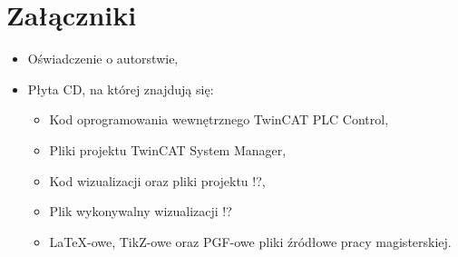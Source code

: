 \section{Załączniki}
\begin{itemize}
\item Oświadczenie o autorstwie,
\item Płyta CD, na której znajdują się:
\begin{itemize}
\item Kod oprogramowania wewnętrznego TwinCAT PLC Control,
\item Pliki projektu TwinCAT System Manager,
\item Kod wizualizacji oraz pliki projektu !?,
\item Plik wykonywalny wizualizacji !?
\item \LaTeX-owe, TikZ-owe oraz PGF-owe  pliki źródłowe pracy magisterskiej.
\end{itemize}
\end{itemize}
